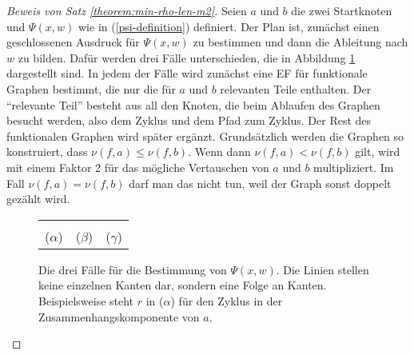\documentclass[a4paper, 11pt, ngerman]{article}
\begin{document}
\begin{proof}[Beweis von Satz \ref{theorem:min-rho-len-m2}]
    Seien $a$ und $b$ die zwei Startknoten und $\Psi(x, w)$ wie in (\ref{psi-definition}) definiert. Der Plan ist, zunächst einen geschlossenen Ausdruck für $\Psi(x, w)$ zu bestimmen und dann die Ableitung nach $w$ zu bilden. Dafür werden drei Fälle unterschieden, die in Abbildung \ref{fig:psi-construction} dargestellt sind. In jedem der Fälle wird zunächst eine EF für funktionale Graphen bestimmt, die nur die für $a$ und $b$ relevanten Teile enthalten. Der "`relevante Teil"' besteht aus all den Knoten, die beim Ablaufen des Graphen besucht werden, also dem Zyklus und dem Pfad zum Zyklus. Der Rest des funktionalen Graphen wird später ergänzt. Grundsätzlich werden die Graphen so konstruiert, dass $\nu(f, a) \le \nu(f, b)$. Wenn dann $\nu(f, a) < \nu(f, b)$ gilt, wird mit einem Faktor 2 für das mögliche Vertauschen von $a$ und $b$ multipliziert. Im Fall $\nu(f, a) = \nu(f, b)$ darf man das nicht tun, weil der Graph sonst doppelt gezählt wird.

    \begin{figure}
        \begin{tabular}{ccc}
            \def\svgwidth{145pt}  &
            \def\svgwidth{145pt}   &
            \def\svgwidth{145pt}                           \\
            ($\alpha$)                                 & ($\beta$) & ($\gamma$)
        \end{tabular}
        \caption{Die drei Fälle für die Bestimmung von $\Psi(x, w)$. Die Linien stellen keine einzelnen Kanten dar, sondern eine Folge an Kanten. Beispielsweise steht $r$ in ($\alpha$) für den Zyklus in der Zusammenhangskomponente von $a$.}
        \label{fig:psi-construction}
    \end{figure}


\end{proof}
\end{document}
